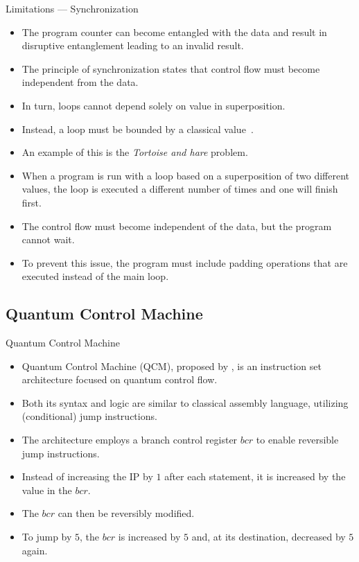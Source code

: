 \begin{frame}{Limitations --- Synchronization}
    \begin{itemize}
        \item The program counter can become entangled with the data and result in disruptive entanglement leading to an invalid result.
        \item The principle of synchronization states that control flow must become independent from the data.
        \item In turn, loops cannot depend solely on value in superposition.
        \item Instead, a loop must be bounded by a classical value~\cite{YVC24}. 
        \item An example of this is the \emph{Tortoise and hare} problem.
        \item When a program is run with a loop based on a superposition of two different values, the loop is executed a different number of times and one will finish first.
        \item The control flow must become independent of the data, but the program cannot wait.
        \item To prevent this issue, the program must include padding operations that are executed instead of the main loop.
    \end{itemize}
\end{frame}

\subsection{Quantum Control Machine}
\begin{frame}{Quantum Control Machine}
    \begin{itemize}
        \item Quantum Control Machine (QCM), proposed by \cite{YVC24}, is an instruction set architecture focused on quantum control flow.
        \item Both its syntax and logic are similar to classical assembly language, utilizing (conditional) jump instructions.
        \item The architecture employs a branch control register $bcr$ to enable reversible jump instructions.
        \item Instead of increasing the IP by $1$ after each statement, it is increased by the value in the $bcr$.
        \item The $bcr$ can then be reversibly modified.
        \item To jump by $5$, the $bcr$ is increased by $5$ and, at its destination, decreased by $5$ again.
    \end{itemize}
\end{frame}


